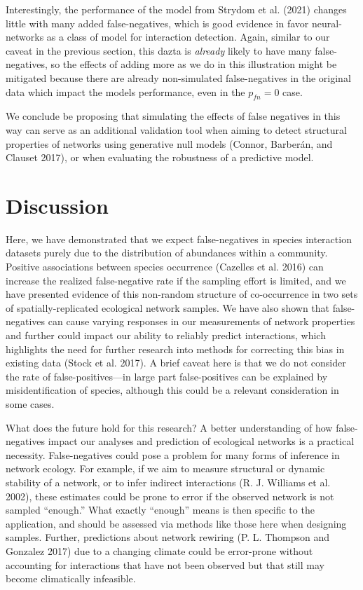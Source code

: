 \documentclass[10pt,oneside]{article}
\begin{document}
Interestingly, the performance of the model from Strydom et al. (2021)
changes little with many added false-negatives, which is good evidence
in favor neural-networks as a class of model for interaction detection.
Again, similar to our caveat in the previous section, this dazta is
\emph{already} likely to have many false-negatives, so the effects of
adding more as we do in this illustration might be mitigated because
there are already non-simulated false-negatives in the original data
which impact the models performance, even in the \(p_{fn} = 0\) case.

We conclude be proposing that simulating the effects of false negatives
in this way can serve as an additional validation tool when aiming to
detect structural properties of networks using generative null models
(Connor, Barberán, and Clauset 2017), or when evaluating the robustness
of a predictive model.

\hypertarget{discussion}{%
\section{Discussion}\label{discussion}}

Here, we have demonstrated that we expect false-negatives in species
interaction datasets purely due to the distribution of abundances within
a community. Positive associations between species occurrence (Cazelles
et al. 2016) can increase the realized false-negative rate if the
sampling effort is limited, and we have presented evidence of this
non-random structure of co-occurrence in two sets of
spatially-replicated ecological network samples. We have also shown that
false-negatives can cause varying responses in our measurements of
network properties and further could impact our ability to reliably
predict interactions, which highlights the need for further research
into methods for correcting this bias in existing data (Stock et al.
2017). A brief caveat here is that we do not consider the rate of
false-positives---in large part false-positives can be explained by
misidentification of species, although this could be a relevant
consideration in some cases.

What does the future hold for this research? A better understanding of
how false-negatives impact our analyses and prediction of ecological
networks is a practical necessity. False-negatives could pose a problem
for many forms of inference in network ecology. For example, if we aim
to measure structural or dynamic stability of a network, or to infer
indirect interactions (R. J. Williams et al. 2002), these estimates
could be prone to error if the observed network is not sampled
``enough.'' What exactly ``enough'' means is then specific to the
application, and should be assessed via methods like those here when
designing samples. Further, predictions about network rewiring (P. L.
Thompson and Gonzalez 2017) due to a changing climate could be
error-prone without accounting for interactions that have not been
observed but that still may become climatically infeasible.
\end{document}
